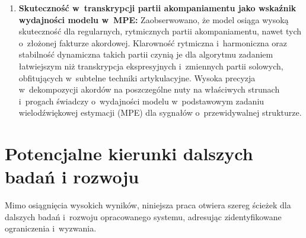 \begin{enumerate}
    \item \textbf{Skuteczność w~transkrypcji partii akompaniamentu jako wskaźnik wydajności modelu w~MPE:} Zaobserwowano, że model osiąga wysoką skuteczność dla regularnych, rytmicznych partii akompaniamentu, nawet tych o~złożonej fakturze akordowej. Klarowność rytmiczna i~harmoniczna oraz stabilność dynamiczna takich partii czynią je dla algorytmu zadaniem łatwiejszym niż transkrypcja ekspresyjnych i~zmiennych partii solowych, obfitujących w~subtelne techniki artykulacyjne. Wysoka precyzja w~dekompozycji akordów na poszczególne nuty na właściwych strunach i~progach świadczy o~wydajności modelu w~podstawowym zadaniu wielodźwiękowej estymacji (MPE) dla sygnałów o~przewidywalnej strukturze.
\end{enumerate}

\section{Potencjalne kierunki dalszych badań i rozwoju}
\label{sec:kierunki_rozwoju}

Mimo osiągnięcia wysokich wyników, niniejsza praca otwiera szereg ścieżek dla dalszych badań i~rozwoju opracowanego systemu, adresując zidentyfikowane ograniczenia i~wyzwania.

